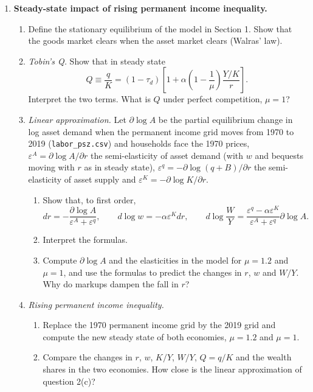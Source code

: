 \begin{enumerate}
\item \textbf{Steady-state impact of rising permanent income inequality.}
\begin{enumerate}
\item Define the stationary equilibrium of the model in Section 1. Show that the goods market clears when the asset market clears (Walras' law).
\item \emph{Tobin's Q.} Show that in steady state
$$Q\equiv\frac{q}{K}=(1-\tau_d)\left[1+\alpha\left(1-\frac{1}{\mu}\right)\frac{Y/K}{r}\right].$$
Interpret the two terms. What is $Q$ under perfect competition, $\mu=1$?
\item \emph{Linear approximation.} Let $\partial\log A$ be the partial equilibrium change in log asset demand when the permanent income grid moves from 1970 to 2019 (\texttt{labor\_psz.csv}) and households face the 1970 prices, $\varepsilon^A=\partial\log A/\partial r$ the semi-elasticity of asset demand (with $w$ and bequests moving with $r$ as in steady state), $\varepsilon^q=-\partial\log(q+B)/\partial r$ the semi-elasticity of asset supply and $\varepsilon^K=-\partial\log K/\partial r$.
\begin{enumerate}[label=(\roman*)]
\item Show that, to first order,
$$dr=-\frac{\partial\log A}{\varepsilon^A+\varepsilon^q},\qquad d\log w=-\alpha\varepsilon^K dr,\qquad d\log\frac{W}{Y}=\frac{\varepsilon^q-\alpha\varepsilon^K}{\varepsilon^A+\varepsilon^q}\partial\log A.$$
\item Interpret the formulas.
\item Compute $\partial\log A$ and the elasticities in the model for $\mu=1.2$ and $\mu=1$, and use the formulas to predict the changes in $r$, $w$ and $W/Y$. Why do markups dampen the fall in $r$?
\end{enumerate}
\item \emph{Rising permanent income inequality.}
\begin{enumerate}[label=(\roman*)]
\item Replace the 1970 permanent income grid by the 2019 grid and compute the new steady state of both economies, $\mu=1.2$ and $\mu=1$.
\item Compare the changes in $r$, $w$, $K/Y$, $W/Y$, $Q=q/K$ and the wealth shares in the two economies. How close is the linear approximation of question 2(c)?

\end{enumerate}
\end{enumerate}
\end{enumerate}
